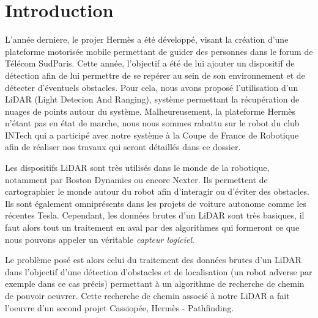 \section*{Introduction}

\tab L'année derniere, le projer Hermès a été développé, visant la création d'une plateforme motorisée mobile permettant de guider des personnes dans le forum de Télécom SudParis. Cette année, l'objectif a été de lui ajouter un dispositif de détection afin de lui permettre de se repérer au sein de son environnement et de détecter d'éventuels obstacles. Pour cela, nous avons proposé l'utilisation d'un LiDAR (Light Detecion And Ranging), système permettant la récupération de nuages de points autour du système. Malheureusement, la plateforme Hermès n'étant pas en état de marche, nous nous sommes rabattu sur le robot du club INTech qui a participé avec notre système à la Coupe de France de Robotique afin de réaliser nos travaux qui seront détaillés dans ce dossier.

\tab Les dispositifs LiDAR sont très utilisés dans le monde de la robotique, notamment par Boston Dynamics ou encore Nexter. Ils permettent de cartographier le monde autour du robot afin d'interagir ou d'éviter des obstacles. Ils sont également omniprésents dans les projets de voiture autonome comme les récentes Tesla. Cependant, les données brutes d'un LiDAR sont très basiques, il faut alors tout un traitement en aval par des algorithmes qui formeront ce que nous pouvons appeler un véritable \textit{capteur logiciel}.

\tab Le problème posé est alors celui du traitement des données brutes d'un LiDAR dans l'objectif d'une détection d'obstacles et de localisation (un robot adverse par exemple dans ce cas précis) permettant à un algorithme de recherche de chemin de pouvoir oeuvrer. Cette recherche de chemin associé à notre LiDAR a fait l'oeuvre d'un second projet Cassiopée, Hermès - Pathfinding.